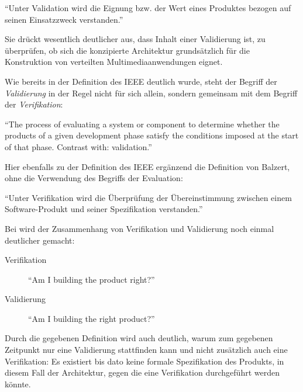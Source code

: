   \begin{definition}\label{def:validierung_balzert}
    "`Unter Validation wird die Eignung bzw. der Wert eines Produktes bezogen auf seinen Einsatzzweck verstanden."' \emph{\citep[S. 101]{balzert1998lst}}
  \end{definition}
  
  Sie drückt wesentlich deutlicher aus, dass Inhalt einer Validierung ist, zu überprüfen, ob sich die konzipierte Architektur grundsätzlich für die Konstruktion von verteilten Multimediaanwendungen eignet.
  
  Wie bereits in der Definition des IEEE deutlich wurde, steht der Begriff der \emph{Validierung} in der Regel nicht für sich allein, sondern gemeinsam mit dem Begriff der \emph{Verifikation}:
  
  \begin{definition}\label{def:verifikation_ieee}
    "`The process of evaluating a system or component to determine whether the products of a given development phase satisfy the conditions imposed at the start of that phase. Contrast with: validation."' \emph{\citep{ieee90sg}}
  \end{definition}
  
  Hier ebenfalls zu der Definition des IEEE ergänzend die Definition von Balzert, ohne die Verwendung des Begriffs der Evaluation:
  
  \begin{definition}\label{def:verifikation_balzert}
    "`Unter Verifikation wird die Überprüfung der Übereinstimmung zwischen einem Software-Produkt und seiner Spezifikation verstanden."' \emph{\citep[S. 101]{balzert1998lst}}
  \end{definition}
  
  Bei \citep{boehm1984vv} wird der Zusammenhang von Verifikation und Validierung noch einmal deutlicher gemacht:
  
  \begin{description}
    \item[Verifikation] "`Am I building the product right?"' \citep[S. 75]{boehm1984vv}
    \item[Validierung] "`Am I building the right product?"' \citep[S. 75]{boehm1984vv}
  \end{description}
  
  Durch die gegebenen Definition wird auch deutlich, warum zum gegebenen Zeitpunkt nur eine Validierung stattfinden kann und nicht zusätzlich auch eine Verifikation: Es existiert bis dato keine formale Spezifikation des Produkts, in diesem Fall der Architektur, gegen die eine Verifikation durchgeführt werden könnte.
  
